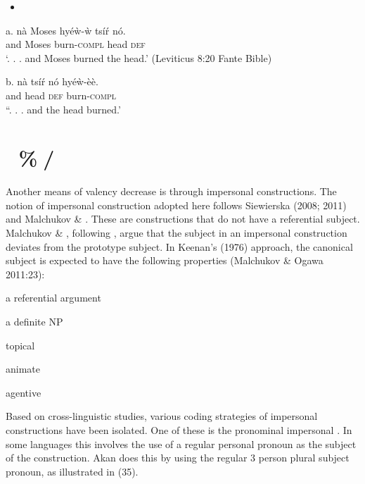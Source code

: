 \documentclass[output=paper]{langsci/langscibook}
\begin{document}
\begin{itemize}
\item \end{itemize}
\gll a.  n\`{a}  Moses    hy\'{e}\`{w}-\`{w}   ts\'{i}\'{r}  n\'{o}.\\
       and   Moses     burn-\textsc{compl}  head  \textsc{def}\\
\glt ‘. . .  and Moses burned the head.’ (Leviticus 8:20 Fante Bible)
\z

\gll  b.  n\`{a}  ts\'{i}\'{r}   n\'{o}  hy\'{e}\`{w}-\`{e}\`{e}.\\
       and  head  \textsc{def}  burn-\textsc{compl}  \\
\glt “. .  . and the head burned.’
\z

\section{ \%/}

Another means of valency decrease is through impersonal constructions. The notion of impersonal construction adopted here follows Siewierska (2008; 2011) and Malchukov \& \citet{Ogawa2011}. These are constructions that do not have a referential subject. Malchukov \& \citet{Ogawa2011}, following \citet{Keenan1976}, argue that the subject in an impersonal construction deviates from the prototype subject. In Keenan’s (1976) approach, the canonical subject is expected to have the following properties (Malchukov \& Ogawa 2011:23):

\begin{styleNoSpacing}
a referential argument
\end{styleNoSpacing}

\begin{styleNoSpacing}
a definite NP
\end{styleNoSpacing}

\begin{styleNoSpacing}
topical
\end{styleNoSpacing}

\begin{styleNoSpacing}
animate
\end{styleNoSpacing}

\begin{styleNoSpacing}
agentive
\end{styleNoSpacing}

Based on cross-linguistic studies, various coding strategies of impersonal constructions have been isolated. One of these is the pronominal impersonal \citep{Siewierska2011}. In some languages this involves the use of a regular personal pronoun as the subject of the construction. Akan does this by using the regular 3 person plural subject pronoun, as illustrated in (35).
\end{document}
